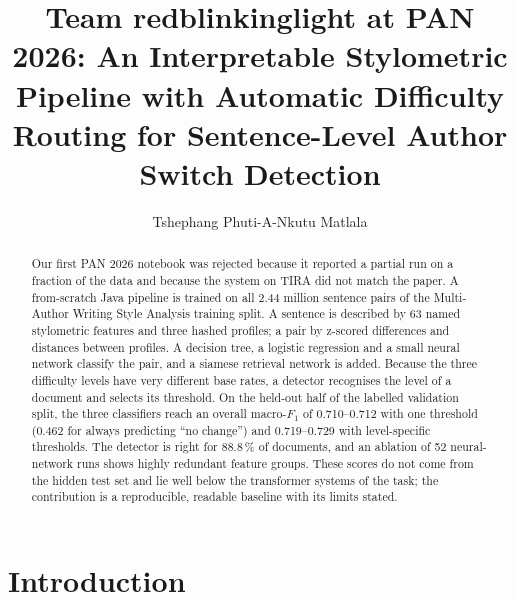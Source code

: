\documentclass[runningheads]{llncs}
\begin{document}
\title{Team redblinkinglight at PAN 2026: An Interpretable Stylometric Pipeline with Automatic Difficulty Routing for Sentence-Level Author Switch Detection}

\author{Tshephang Phuti-A-Nkutu Matlala}

\maketitle

\begin{abstract}
Our first PAN 2026 notebook was rejected because it reported a partial run on a fraction of the data and because the system on TIRA did not match the paper. A from-scratch Java pipeline is trained on all 2.44 million sentence pairs of the Multi-Author Writing Style Analysis training split. A sentence is described by 63 named stylometric features and three hashed profiles; a pair by z-scored differences and distances between profiles. A decision tree, a logistic regression and a small neural network classify the pair, and a siamese retrieval network is added. Because the three difficulty levels have very different base rates, a detector recognises the level of a document and selects its threshold. On the held-out half of the labelled validation split, the three classifiers reach an overall macro-$F_1$ of 0.710--0.712 with one threshold (0.462 for always predicting ``no change'') and 0.719--0.729 with level-specific thresholds. The detector is right for 88.8\,\% of documents, and an ablation of 52 neural-network runs shows highly redundant feature groups. These scores do not come from the hidden test set and lie well below the transformer systems of the task; the contribution is a reproducible, readable baseline with its limits stated.

\end{abstract}

\section{Introduction}
\end{document}
